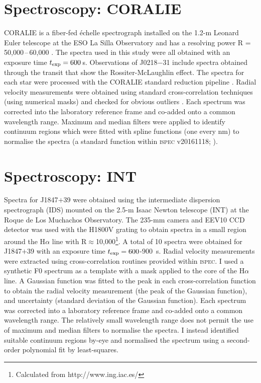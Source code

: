 		


\section{Spectroscopy: CORALIE}

CORALIE is a fiber-fed \'{e}chelle spectrograph installed on the 1.2-m Leonard Euler telescope at the ESO La Silla Observatory and has a resolving power R = 50,000\,--\,60,000 \citep{2001A&A...379..279Q,Wilson2008}. The spectra used in this study were all obtained with an exposure time $t_{\rm exp} = 600$\,s. Observations of J0218$-$31 include spectra obtained through the transit that show the Rossiter-McLaughlin effect. The spectra for each star were processed with the CORALIE standard reduction pipeline \citep{26AS..119..373B}. Radial velocity measurements were obtained using standard cross-correlation techniques (using numerical masks) and checked for obvious outliers \citep{Triaud2017}. Each spectrum was corrected into the laboratory reference frame and co-added onto a common wavelength range. Maximum and median filters were applied to identify continuum regions which were fitted with spline functions (one every nm) to normalise the spectra (a standard function within \textsc{ispec} v20161118; \citealt{Blanco-Cuaresma2017}). 


\section{Spectroscopy: INT}

Spectra for J1847$+$39 were obtained using the intermediate dispersion spectrograph (IDS) mounted on the 2.5-m Isaac Newton telescope (INT) at the Roque de Los Muchachos Observatory. The 235-mm camera and EEV10 CCD detector was used with the H1800V grating to obtain spectra in a small region around the H$\alpha$ line with R$\approx$10,000\footnote{Calculated from http://www.ing.iac.es/}. A total of 10 spectra were obtained for J1847$+$39 with an exposure time $t_{\rm exp} = 600$-$900$\, s. Radial velocity measurements were extracted using cross-correlation routines provided within \textsc{ispec}. I used a synthetic F0 spectrum as a template with a mask applied to the core of the H$\alpha$ line. A Gaussian function was fitted to the peak in each cross-correlation function to obtain the radial velocity measurement (the peak of the Gaussian function), and uncertainty (standard deviation of the Gaussian function). Each spectrum was corrected into a laboratory reference frame and co-added onto a common wavelength range. The relatively small wavelength range does not permit the use of maximum and median filters to normalise the spectra. I instead identified suitable continuum regions by-eye and normalised the spectrum using a second-order polynomial fit by least-squares.  

